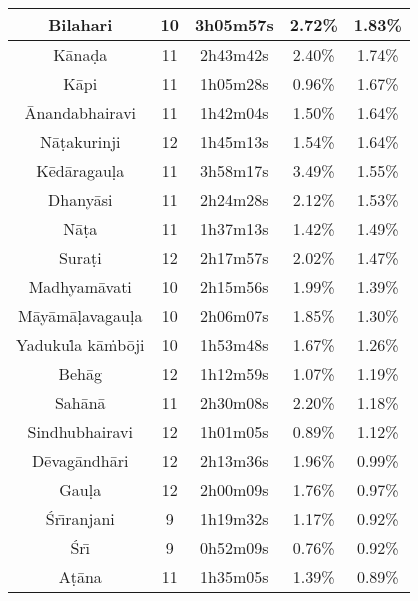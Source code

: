 \begin{table}
{\begin{tabular}{*5c}
      Bilahari                         & 10 & 3h05m57s &      2.72\% &      1.83\%  \\\midrule
      K\=ana\d{d}a                     & 11 & 2h43m42s &      2.40\% &      1.74\%  \\\midrule
      K\=api                           & 11 & 1h05m28s &      0.96\% &      1.67\%  \\\midrule
      \=Anandabhairavi                 & 11 & 1h42m04s &      1.50\% &      1.64\%  \\\midrule
      N\=a\d{t}akurinji                & 12 & 1h45m13s &      1.54\% &      1.64\%  \\\midrule
      K\=ed\=aragau\d{l}a              & 11 & 3h58m17s &      3.49\% &      1.55\%  \\\midrule
      Dhany\=asi                       & 11 & 2h24m28s &      2.12\% &      1.53\%  \\\midrule
      N\=a\d{t}a                       & 11 & 1h37m13s &      1.42\% &      1.49\%  \\\midrule
      Sura\d{t}i                       & 12 & 2h17m57s &      2.02\% &      1.47\%  \\\midrule
      Madhyam\=avati                   & 10 & 2h15m56s &      1.99\% &      1.39\%  \\\midrule
      M\=ay\=am\=a\d{l}avagau\d{l}a    & 10 & 2h06m07s &      1.85\% &      1.30\%  \\\midrule
      Yaduku\.{l}a k\=a\.{m}b\=oji     & 10 & 1h53m48s &      1.67\% &      1.26\%  \\\midrule
      Beh\=ag                          & 12 & 1h12m59s &      1.07\% &      1.19\%  \\\midrule
      Sah\=an\=a                       & 11 & 2h30m08s &      2.20\% &      1.18\%  \\\midrule
      Sindhubhairavi                   & 12 & 1h01m05s &      0.89\% &      1.12\%  \\\midrule
      D\=evag\=andh\=ari               & 12 & 2h13m36s &      1.96\% &      0.99\%  \\\midrule
      Gau\d{l}a                        & 12 & 2h00m09s &      1.76\% &      0.97\%  \\\midrule
      Śr\={\i}ranjani                  & 9  & 1h19m32s &      1.17\% &      0.92\% \\\midrule
      Śr\={\i}                         & 9  & 0h52m09s &      0.76\% &      0.92\% \\\midrule
      A\d{t}\=ana                      & 11 & 1h35m05s &      1.39\% &      0.89\%  \\\midrule

\end{tabular}}
\end{table}
